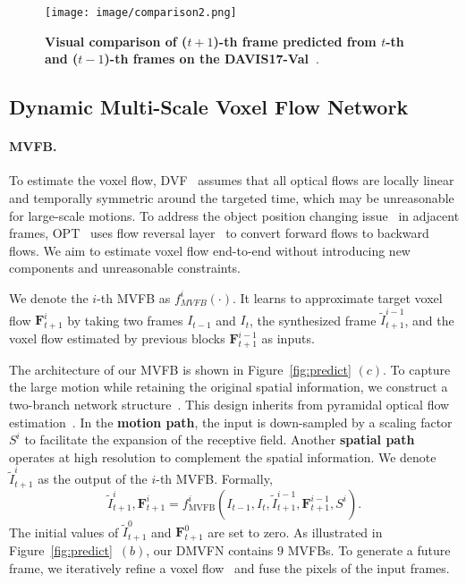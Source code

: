 \documentclass[10pt,twocolumn,letterpaper]{article}
\begin{document}
\begin{figure*}[htbp]
	\centering
	\texttt{[image: image/comparison2.png]}
	\caption{\textbf{Visual comparison of ($t+1$)-th frame predicted from $t$-th and ($t-1$)-th frames on the DAVIS17-Val~\cite{davis}}.}
	\label{fig:davis17}
 \vspace{-1em}
\end{figure*}

\subsection{Dynamic Multi-Scale Voxel Flow Network}
\label{sec:dmvfn}

\paragraph{MVFB.} To estimate the voxel flow, DVF~\cite{dvf} assumes that all optical flows are locally linear and temporally symmetric around the targeted time, which may be unreasonable for large-scale motions. To address the object position changing issue~\cite{rife} in adjacent frames, OPT~\cite{wu2022optimizing} uses flow reversal layer~\cite{qvi} to convert forward flows to backward flows. We aim to estimate voxel flow end-to-end without introducing new components and unreasonable constraints.

We denote the $i$-th MVFB as $f^i_{MVFB}(\cdot)$. It learns to approximate target voxel flow $\textbf{F}^{i}_{t+1}$ by
taking two frames $I_{t-1}$ and $I_t$, the synthesized frame $\tilde{I}^{i-1}_{t+1}$, and the voxel flow estimated by previous blocks $\textbf{F}^{i-1}_{t+1}$ as inputs.

The architecture of our MVFB is shown in Figure~\ref{fig:predict} $(c)$. To capture the large motion while retaining the original spatial information, we construct a two-branch network structure~\cite{yu2018bisenet}. This design inherits from pyramidal optical flow estimation~\cite{pwcnet,spynet}. In the \textbf{motion path}, the input is down-sampled by a scaling factor $S^i$ to facilitate the expansion of the receptive field. Another \textbf{spatial path} operates at high resolution to complement the spatial information. We denote $\tilde{I}^{i}_{t+1} $ as the output of the $i$-th MVFB. Formally,
\begin{equation}
\tilde{I}^{i}_{t+1}, \textbf{F}^i_{t+1} = f_{\mathrm{MVFB}}^i (I_{t-1}, I_t, \tilde{I}^{i-1}_{t+1}, \textbf{F}^{i-1}_{t+1}, S^i).
\end{equation}
The initial values of $\tilde{I}_{t+1}^{0}$ and $\textbf{F}^{0}_{t+1}$ are set to zero. As illustrated in Figure~\ref{fig:predict}~$(b)$, our DMVFN contains $9$ MVFBs. To generate a future frame, we iteratively refine a voxel flow~\cite{dvf} and fuse the pixels of the input frames. 
\end{document}
